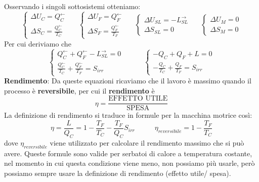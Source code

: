 Osservando i singoli sottosistemi otteniamo:
\[
    \begin{cases}
        \Delta U_C = Q_C^\leftarrow \\ \Delta S_C = \frac{Q_C^\leftarrow }{T_C}
    \end{cases} \;\;\;\;\; \begin{cases}
        \Delta U_F = Q_F^\leftarrow \\ \Delta S_F = \frac{Q_F^\leftarrow}{T_F}
    \end{cases} \;\;\;\;\; \begin{cases}
        \Delta U_{SL} = - L_{SL}^\rightarrow \\ \Delta S_{SL} = 0
    \end{cases} \;\;\;\;\; \begin{cases}
        \Delta U_M = 0\\ \Delta S_M = 0
    \end{cases}
\]
Per cui deriviamo che
\[
    \begin{cases}
        Q_C^\leftarrow  + Q_F^\leftarrow  - L_{SL}^\rightarrow  = 0\\
        \frac{Q_C^\leftarrow}{T_C} + \frac{Q_F^\leftarrow}{T_F} = S_{irr}
    \end{cases} \;\;\;\;\;\;\;\;\;\; \begin{cases}
        -Q_C + Q_F + L = 0\\
        -\frac{Q_C}{T_C} + \frac{Q_F}{T_F} = S_{irr}
    \end{cases}
\]
\textbf{Rendimento}:\newline
Da queste equazioni ricaviamo che il lavoro è massimo quando il processo è \textbf{reversibile}, per cui il \textbf{rendimento} è
\[
    \eta = \frac{\text{EFFETTO UTILE}}{\text{SPESA}}
\]
La definizione di rendimento si traduce in formule per la macchina motrice così:
\[
    \eta = \frac{L}{Q_C} = 1- \frac{T_F}{T_C} - \frac{T_F}{Q_C} S_{irr} \;\;\;\;\;\;\;\;\;\;\eta_{reversibile} = 1 - \frac{T_F}{T_C}
\]
dove $\eta_{reversibile}$ viene utilizzato per calcolare il rendimento massimo che si può avere.\newline
Queste formule sono valide per serbatoi di calore a temperatura costante, nel momento in cui questa condizione viene meno, non possiamo più usarle, però possiamo sempre usare la definizione di rendimento (effetto utile/ spesa).
